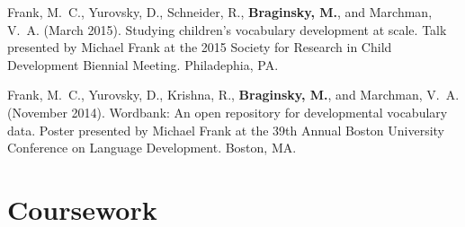 \documentclass[11pt,letter]{moderncv}
\begin{document}
\begin{small}
\begin{thebibliography}{}
Frank, M.~C., Yurovsky, D., Schneider, R., \textbf{Braginsky, M.}, and Marchman, V.~A. (March 2015).
\newblock Studying children's vocabulary development at scale.
\newblock Talk presented by Michael Frank at the 2015 Society for Research in Child
  Development Biennial Meeting.
  Philadephia, PA.

Frank, M.~C., Yurovsky, D., Krishna, R., \textbf{Braginsky, M.}, and Marchman, V.~A. (November 2014).
\newblock Wordbank: An open repository for developmental vocabulary data.
\newblock Poster presented by Michael Frank at the 39th Annual Boston University
  Conference on Language Development.
  Boston, MA.
 
\end{thebibliography}
\end{small}


%

%


%

%

\vspace*{0.25em}

\section{Coursework}

\vspace*{-0.25em}
\end{document}

